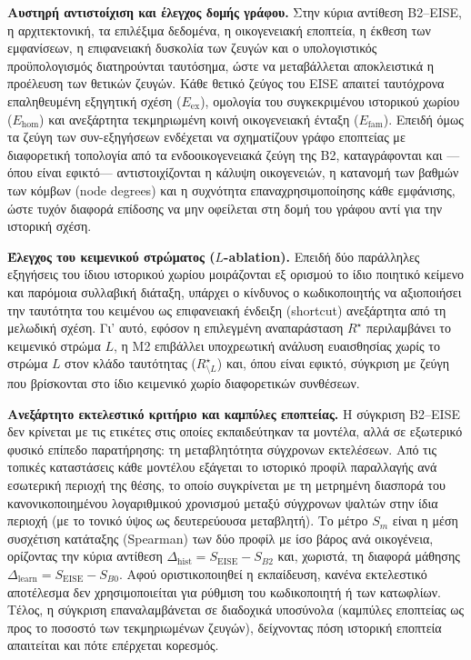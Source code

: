 \documentclass[11pt,a4paper]{article}
\begin{document}
\textbf{Αυστηρή αντιστοίχιση και έλεγχος δομής γράφου.} Στην κύρια αντίθεση B2--EISE, η αρχιτεκτονική, τα επιλέξιμα δεδομένα, η οικογενειακή εποπτεία, η έκθεση των εμφανίσεων, η επιφανειακή δυσκολία των ζευγών και ο υπολογιστικός προϋπολογισμός διατηρούνται ταυτόσημα, ώστε να μεταβάλλεται αποκλειστικά η προέλευση των θετικών ζευγών. Κάθε θετικό ζεύγος του EISE απαιτεί ταυτόχρονα επαληθευμένη εξηγητική σχέση (\(E_{\mathrm{ex}}\)), ομολογία του συγκεκριμένου ιστορικού χωρίου (\(E_{\mathrm{hom}}\)) και ανεξάρτητα τεκμηριωμένη κοινή οικογενειακή ένταξη (\(E_{\mathrm{fam}}\)). Επειδή όμως τα ζεύγη των συν-εξηγήσεων ενδέχεται να σχηματίζουν γράφο εποπτείας με διαφορετική τοπολογία από τα ενδοοικογενειακά ζεύγη της B2, καταγράφονται και ---όπου είναι εφικτό--- αντιστοιχίζονται η κάλυψη οικογενειών, η κατανομή των βαθμών των κόμβων (node degrees) και η συχνότητα επαναχρησιμοποίησης κάθε εμφάνισης, ώστε τυχόν διαφορά επίδοσης να μην οφείλεται στη δομή του γράφου αντί για την ιστορική σχέση.

\textbf{Έλεγχος του κειμενικού στρώματος (\(L\)-ablation).} Επειδή δύο παράλληλες εξηγήσεις του ίδιου ιστορικού χωρίου μοιράζονται εξ ορισμού το ίδιο ποιητικό κείμενο και παρόμοια συλλαβική διάταξη, υπάρχει ο κίνδυνος ο κωδικοποιητής να αξιοποιήσει την ταυτότητα του κειμένου ως επιφανειακή ένδειξη (shortcut) ανεξάρτητα από τη μελωδική σχέση. Γι' αυτό, εφόσον η επιλεγμένη αναπαράσταση \(R^\star\) περιλαμβάνει το κειμενικό στρώμα \(L\), η Μ2 επιβάλλει υποχρεωτική ανάλυση ευαισθησίας χωρίς το στρώμα \(L\) στον κλάδο ταυτότητας (\(R^\star_{\setminus L}\)) και, όπου είναι εφικτό, σύγκριση με ζεύγη που βρίσκονται στο ίδιο κειμενικό χωρίο διαφορετικών συνθέσεων.

\textbf{Ανεξάρτητο εκτελεστικό κριτήριο και καμπύλες εποπτείας.} Η σύγκριση B2--EISE δεν κρίνεται με τις ετικέτες στις οποίες εκπαιδεύτηκαν τα μοντέλα, αλλά σε εξωτερικό φυσικό επίπεδο παρατήρησης: τη μεταβλητότητα σύγχρονων εκτελέσεων. Από τις τοπικές καταστάσεις κάθε μοντέλου εξάγεται το ιστορικό προφίλ παραλλαγής ανά εσωτερική περιοχή της θέσης, το οποίο συγκρίνεται με τη μετρημένη διασπορά του κανονικοποιημένου λογαριθμικού χρονισμού μεταξύ σύγχρονων ψαλτών στην ίδια περιοχή (με το τονικό ύψος ως δευτερεύουσα μεταβλητή). Το μέτρο \(S_m\) είναι η μέση συσχέτιση κατάταξης (Spearman) των δύο προφίλ με ίσο βάρος ανά οικογένεια, ορίζοντας την κύρια αντίθεση \(\Delta_{\mathrm{hist}} = S_{\mathrm{EISE}} - S_{B2}\) και, χωριστά, τη διαφορά μάθησης \(\Delta_{\mathrm{learn}} = S_{\mathrm{EISE}} - S_{B0}\). Αφού οριστικοποιηθεί η εκπαίδευση, κανένα εκτελεστικό αποτέλεσμα δεν χρησιμοποιείται για ρύθμιση του κωδικοποιητή ή των κατωφλίων. Τέλος, η σύγκριση επαναλαμβάνεται σε διαδοχικά υποσύνολα (καμπύλες εποπτείας ως προς το ποσοστό των τεκμηριωμένων ζευγών), δείχνοντας πόση ιστορική εποπτεία απαιτείται και πότε επέρχεται κορεσμός.
\end{document}
